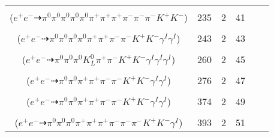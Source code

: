 \documentclass[landscape]{article}
\newcounter{rownumbers}
\newcommand\rn{\stepcounter{rownumbers}\arabic{rownumbers}}
\newcommand{\EOL}{\\} %
\newcommand{\topoTags}[1]{#1} %
\begin{document}
\begin{longtable}{clcccc}
\rn & \makecell[l]{ $ 
e^{+} e^{-} \rightarrow \pi^{0} \pi^{0} \pi^{0} \pi^{+} \pi^{+} \pi^{-} \rho^{+} \rho^{-} K^{*} K^{-} ,
\rho^{+} \rightarrow \pi^{0} \pi^{+} ,
\rho^{-} \rightarrow \pi^{0} \pi^{-} ,
K^{*} \rightarrow \pi^{-} K^{+} 
$ \\ ($
e^{+} e^{-} \dashrightarrow \pi^{0} \pi^{0} \pi^{0} \pi^{0} \pi^{0} \pi^{+} \pi^{+} \pi^{+} \pi^{-} \pi^{-} \pi^{-} K^{+} K^{-} 
$) } & \topoTags{235 & }2 & 41 \EOL

\rn & \makecell[l]{ $ 
e^{+} e^{-} \rightarrow \pi^{0} \pi^{0} \rho^{+} \omega K^{*} K^{-} \gamma^{I} \gamma^{I} ,
\rho^{+} \rightarrow \pi^{0} \pi^{+} ,
\omega \rightarrow \pi^{0} \pi^{+} \pi^{-} ,
K^{*} \rightarrow \pi^{-} K^{+} 
$ \\ ($
e^{+} e^{-} \dashrightarrow \pi^{0} \pi^{0} \pi^{0} \pi^{0} \pi^{+} \pi^{+} \pi^{-} \pi^{-} K^{+} K^{-} \gamma^{I} \gamma^{I} 
$) } & \topoTags{243 & }2 & 43 \EOL

\rn & \makecell[l]{ $ 
e^{+} e^{-} \rightarrow \pi^{0} \pi^{+} K^{0} K^{*-} \phi \gamma^{I} \gamma^{I} \gamma^{I} ,
K^{0} \rightarrow K_{L}^{0} ,
K^{*-} \rightarrow \pi^{-} \bar{K}^{0} ,
\phi \rightarrow K^{+} K^{-} ,
\bar{K}^{0} \rightarrow K_{S}^{0} ,
K_{S}^{0} \rightarrow \pi^{0} \pi^{0} 
$ \\ ($
e^{+} e^{-} \dashrightarrow \pi^{0} \pi^{0} \pi^{0} K_{L}^{0} \pi^{+} \pi^{-} K^{+} K^{-} \gamma^{I} \gamma^{I} \gamma^{I} 
$) } & \topoTags{260 & }2 & 45 \EOL

\rn & \makecell[l]{ $ 
e^{+} e^{-} \rightarrow \pi^{0} \pi^{-} \pi^{-} \rho^{+} \bar{K}^{*} K^{+} \gamma^{I} \gamma^{I} ,
\rho^{+} \rightarrow \pi^{0} \pi^{+} ,
\bar{K}^{*} \rightarrow \pi^{+} K^{-} 
$ \\ ($
e^{+} e^{-} \dashrightarrow \pi^{0} \pi^{0} \pi^{+} \pi^{+} \pi^{-} \pi^{-} K^{+} K^{-} \gamma^{I} \gamma^{I} 
$) } & \topoTags{276 & }2 & 47 \EOL

\rn & \makecell[l]{ $ 
e^{+} e^{-} \rightarrow \pi^{0} \pi^{0} \rho^{0} \pi^{+} \pi^{-} K^{+} K^{-} \gamma^{I} \gamma^{I} ,
\rho^{0} \rightarrow \pi^{+} \pi^{-} 
$ \\ ($
e^{+} e^{-} \dashrightarrow \pi^{0} \pi^{0} \pi^{+} \pi^{+} \pi^{-} \pi^{-} K^{+} K^{-} \gamma^{I} \gamma^{I} 
$) } & \topoTags{374 & }2 & 49 \EOL

\rn & \makecell[l]{ $ 
e^{+} e^{-} \rightarrow \pi^{0} \pi^{+} \pi^{-} \pi^{-} \rho^{+} \rho^{-} \bar{K}^{*} K^{+} \gamma^{I} ,
\rho^{+} \rightarrow \pi^{0} \pi^{+} ,
\rho^{-} \rightarrow \pi^{0} \pi^{-} ,
\bar{K}^{*} \rightarrow \pi^{+} K^{-} 
$ \\ ($
e^{+} e^{-} \dashrightarrow \pi^{0} \pi^{0} \pi^{0} \pi^{+} \pi^{+} \pi^{+} \pi^{-} \pi^{-} \pi^{-} K^{+} K^{-} \gamma^{I} 
$) } & \topoTags{393 & }2 & 51 \EOL


\end{longtable}
\end{document}
